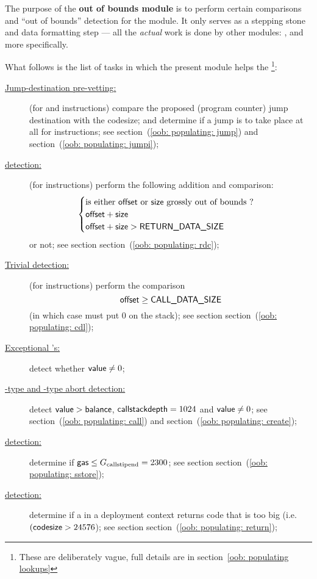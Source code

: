 The purpose of the \textbf{out of bounds module} \oobMod{} is to perform certain comparisons and ``out of bounds'' detection for the \hubMod{} module.
It only serves as a stepping stone and data formatting step --- all the \emph{actual} work is done by other modules: \addMod{}, \modMod{} and \wcpMod{} more specifically.

What follows is the list of tasks in which the present module helps the \hubMod{}\footnote{These are deliberately vague, full details are in section~\ref{oob: populating lookups}}:
\begin{description}
	\item[\underline{Jump-destination pre-vetting:}]
		(for  and  instructions) compare the proposed (program counter) jump destination with the codesize;
		and determine if a jump is to take place at all for  instructions;
		see section~(\ref{oob: populating: jump}) and section~(\ref{oob: populating: jumpi});
	\item[\underline{\rdcxSH{} detection:}]
		(for  instructions) perform the following addition and comparison: 
		\[
			\begin{cases}
				\text{is either \textsf{offset} or \textsf{size} grossly out of bounds ?} \\
				\textsf{offset} + \textsf{size}        \\
				\textsf{offset} + \textsf{size} > \textsf{RETURN\_DATA\_SIZE} \\
			\end{cases}
		\]
		or not;
		see section section~(\ref{oob: populating: rdc});
	\item[\underline{Trivial  detection:}]
		(for  instructions) perform the comparison
		\[
			\textsf{offset} \geq \textsf{CALL\_DATA\_SIZE}
		\]
		(in which case  must put $0$ on the stack);
		see section section~(\ref{oob: populating: cdl});
	\item[\underline{Exceptional 's:}]
		detect whether $\textsf{value} \neq 0$;
	\item[\underline{-type and -type abort detection:}]
		detect $\textsf{value} > \textsf{balance}$, $\textsf{callstackdepth} = 1024$ and $\textsf{value} \neq 0$;
		see section~(\ref{oob: populating: call}) and section~(\ref{oob: populating: create});
	\item[\underline{\sstorexSH{} detection:}]
		determine if $\textsf{gas} \leq G_\text{callstipend} = 2300$;
		see section section~(\ref{oob: populating: sstore});
	\item[\underline{\maxcsxSH{} detection:}]
		determine if a  in a deployment context returns code that is too big (i.e. $(\textsf{codesize} > 24576$);
		see section section~(\ref{oob: populating: return});
\end{description}
